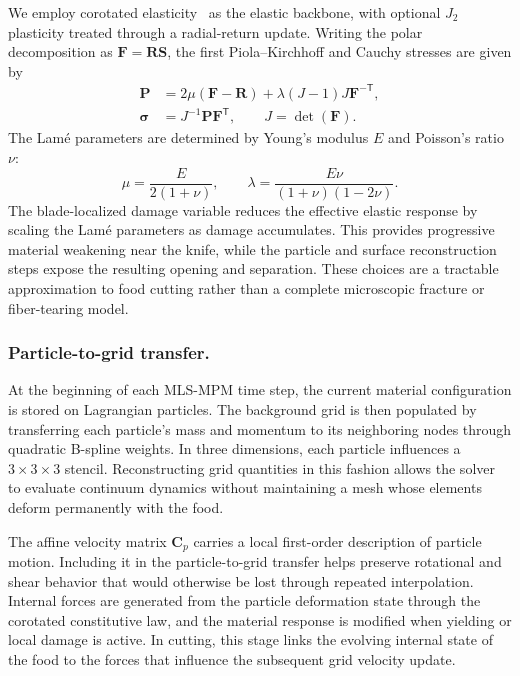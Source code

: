 We employ corotated elasticity~\cite{stomakhin2012energetically} as the elastic backbone, with optional $J_2$ plasticity treated through a radial-return update. Writing the polar decomposition as $\mathbf{F}=\mathbf{R}\mathbf{S}$, the first Piola--Kirchhoff and Cauchy stresses are given by
\begin{subequations}\label{eq:corot_simple}
\begin{align}
  \mathbf{P} &= 2\mu(\mathbf{F}-\mathbf{R})
    +\lambda(J-1)J\mathbf{F}^{-\mathsf{T}},\\
  \boldsymbol{\sigma} &= J^{-1}\mathbf{P}\mathbf{F}^{\mathsf{T}},
  \qquad J=\det(\mathbf{F}).
\end{align}
\end{subequations}
The Lam\'e parameters are determined by Young's modulus $E$ and Poisson's ratio $\nu$:
\begin{equation}\label{eq:lame}
  \mu=\frac{E}{2(1+\nu)},\qquad
  \lambda=\frac{E\nu}{(1+\nu)(1-2\nu)}.
\end{equation}
The blade-localized damage variable reduces the effective elastic response by scaling the Lam\'e parameters as damage accumulates. This provides progressive material weakening near the knife, while the particle and surface reconstruction steps expose the resulting opening and separation. These choices are a tractable approximation to food cutting rather than a complete microscopic fracture or fiber-tearing model.

\subsubsection{Particle-to-grid transfer.}
At the beginning of each MLS-MPM time step, the current material configuration is stored on Lagrangian particles. The background grid is then populated by transferring each particle's mass and momentum to its neighboring nodes through quadratic B-spline weights. In three dimensions, each particle influences a $3\times3\times3$ stencil. Reconstructing grid quantities in this fashion allows the solver to evaluate continuum dynamics without maintaining a mesh whose elements deform permanently with the food.

The affine velocity matrix $\mathbf{C}_p$ carries a local first-order description of particle motion. Including it in the particle-to-grid transfer helps preserve rotational and shear behavior that would otherwise be lost through repeated interpolation. Internal forces are generated from the particle deformation state through the corotated constitutive law, and the material response is modified when yielding or local damage is active. In cutting, this stage links the evolving internal state of the food to the forces that influence the subsequent grid velocity update.

